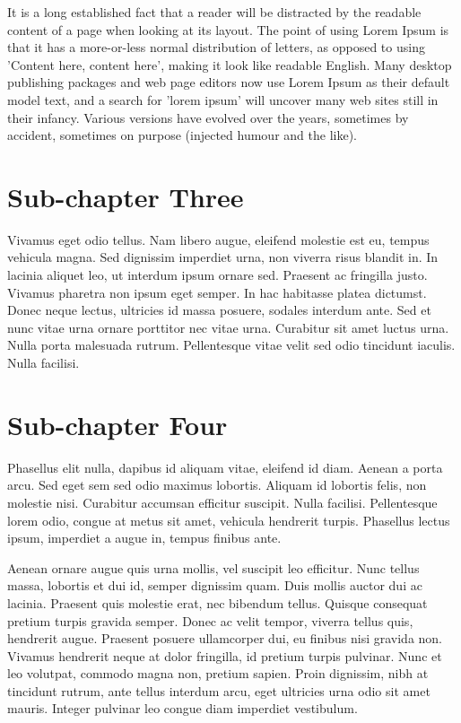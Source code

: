 \begin{spacing}{1.5}
It is a long established fact that a reader will be distracted by the readable content of a page when looking at its layout. The point of using Lorem Ipsum is that it has a more-or-less normal distribution of letters, as opposed to using 'Content here, content here', making it look like readable English. Many desktop publishing packages and web page editors now use Lorem Ipsum as their default model text, and a search for 'lorem ipsum' will uncover many web sites still in their infancy. Various versions have evolved over the years, sometimes by accident, sometimes on purpose (injected humour and the like).

\section{Sub-chapter Three}

Vivamus eget odio tellus. Nam libero augue, eleifend molestie est eu, tempus vehicula magna. Sed dignissim imperdiet urna, non viverra risus blandit in. In lacinia aliquet leo, ut interdum ipsum ornare sed. Praesent ac fringilla justo. Vivamus pharetra non ipsum eget semper. In hac habitasse platea dictumst. Donec neque lectus, ultricies id massa posuere, sodales interdum ante. Sed et nunc vitae urna ornare porttitor nec vitae urna. Curabitur sit amet luctus urna. Nulla porta malesuada rutrum. Pellentesque vitae velit sed odio tincidunt iaculis. Nulla facilisi.

\section{Sub-chapter Four}

Phasellus elit nulla, dapibus id aliquam vitae, eleifend id diam. Aenean a porta arcu. Sed eget sem sed odio maximus lobortis. Aliquam id lobortis felis, non molestie nisi. Curabitur accumsan efficitur suscipit. Nulla facilisi. Pellentesque lorem odio, congue at metus sit amet, vehicula hendrerit turpis. Phasellus lectus ipsum, imperdiet a augue in, tempus finibus ante.

Aenean ornare augue quis urna mollis, vel suscipit leo efficitur. Nunc tellus massa, lobortis et dui id, semper dignissim quam. Duis mollis auctor dui ac lacinia. Praesent quis molestie erat, nec bibendum tellus. Quisque consequat pretium turpis gravida semper. Donec ac velit tempor, viverra tellus quis, hendrerit augue. Praesent posuere ullamcorper dui, eu finibus nisi gravida non. Vivamus hendrerit neque at dolor fringilla, id pretium turpis pulvinar. Nunc et leo volutpat, commodo magna non, pretium sapien. Proin dignissim, nibh at tincidunt rutrum, ante tellus interdum arcu, eget ultricies urna odio sit amet mauris. Integer pulvinar leo congue diam imperdiet vestibulum.


\end{spacing}
